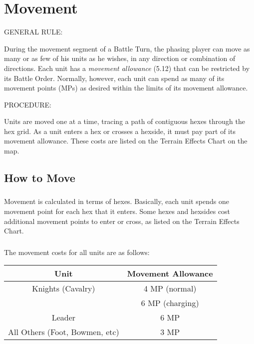 \section{Movement}

GENERAL RULE:

During the movement segment of a Battle Turn, the phasing player can move as many or as few of his units as he wishes, in any direction or combination of directions. Each unit has a \textit{movement allowance} (5.12) that can be restricted by its Battle Order. Normally, however, each unit can spend as many of its movement points (MPs) as desired within the limits of its movement allowance.

PROCEDURE:

Units are moved one at a time, tracing a path of contiguous hexes through the hex grid. As a unit enters a hex or crosses a hexside, it must pay part of its movement allowance. These costs are listed on the Terrain Effects Chart on the map.

\subsection{How to Move}

\subsubsection[Movement Calculation]{} Movement is calculated in terms of hexes. Basically, each unit spends one movement point for each hex that it enters. Some hexes and hexsides cost additional movement points to enter or cross, as listed on the Terrain Effects Chart.

\subsubsection[Movement Costs]{} The movement costs for all units are as follows:

\begin{center}
  \begin{tabular}{ |c|c| }
    \hline
    \textbf{Unit} & \textbf{Movement Allowance} \\
    \hline
    Knights (Cavalry) & 4 MP (normal) \\
    & 6 MP (charging) \\
    Leader & 6 MP \\
    All Others (Foot, Bowmen, etc) & 3 MP \\
    \hline
  \end{tabular}
\end{center}